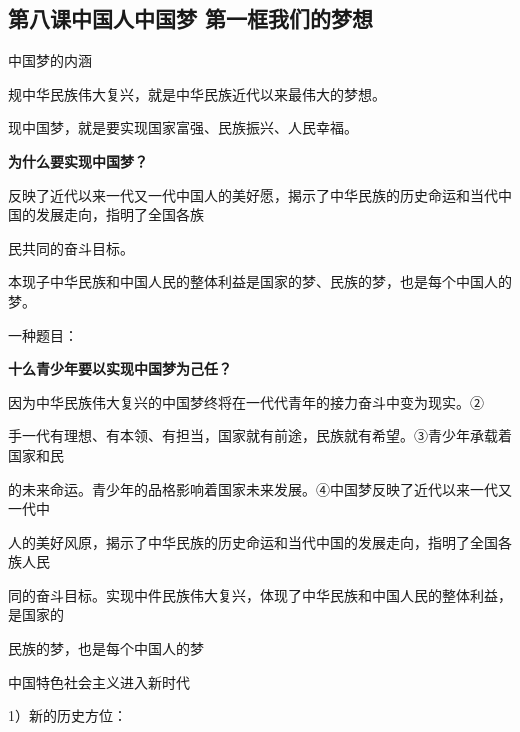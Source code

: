 \documentclass[lang=cn,11pt]{elegantbook}
\newcommand{\daofasym}[1]{{\daofasymbolfont #1}}
\newcommand{\daofasym}[1]{#1}
\begin{document}
\subsection*{第八课中国人中国梦 第一框我们的梦想}

中国梦的内涵\par

规中华民族伟大复兴，就是中华民族近代以来最伟大的梦想。\par

现中国梦，就是要实现国家富强、民族振兴、人民幸福。\par

\textbf{为什么要实现中国梦？}\par

反映了近代以来一代又一代中国人的美好愿，揭示了中华民族的历史命运和当代中国的发展走向，指明了全国各族\par

民共同的奋斗目标。\par

本现子中华民族和中国人民的整体利益是国家的梦、民族的梦，也是每个中国人的梦。\par

一种题目：\par

\textbf{十么青少年要以实现中国梦为己任？}\par

因为中华民族伟大复兴的中国梦终将在一代代青年的接力奋斗中变为现实。\daofasym{②}\par

手一代有理想、有本领、有担当，国家就有前途，民族就有希望。\daofasym{③}青少年承载着国家和民\par

的未来命运。青少年的品格影响着国家未来发展。\daofasym{④}中国梦反映了近代以来一代又一代中\par

人的美好风原，揭示了中华民族的历史命运和当代中国的发展走向，指明了全国各族人民\par

同的奋斗目标。实现中件民族伟大复兴，体现了中华民族和中国人民的整体利益，是国家的\par

民族的梦，也是每个中国人的梦\par

中国特色社会主义进入新时代\par

1）新的历史方位：\par
\end{document}
